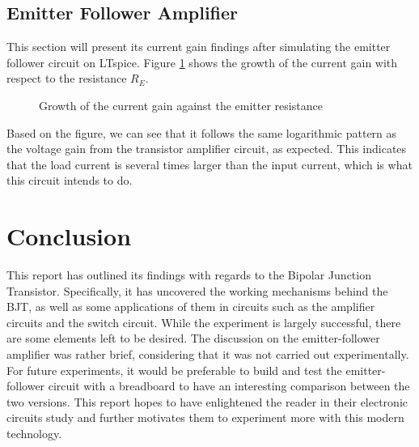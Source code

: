 \documentclass[11pt]{report}
\begin{document}
\subsection{Emitter Follower Amplifier}
This section will present its current gain findings after simulating the emitter follower circuit on LTspice. Figure \ref{sect4} shows the growth of the current gain with respect to the resistance $R_E$.
\begin{figure}[h]
	\centering
	\caption{Growth of the current gain against the emitter resistance}
	\label{sect4}
\end{figure}
Based on the figure, we can see that it follows the same logarithmic pattern as the voltage gain from the transistor amplifier circuit, as expected. This indicates that the load current is several times larger than the input current, which is what this circuit intends to do.

\section{Conclusion}
This report has outlined its findings with regards to the Bipolar Junction Transistor. Specifically, it has uncovered the working mechanisms behind the BJT, as well as some applications of them in circuits such as the amplifier circuits and the switch circuit. While the experiment is largely successful, there are some elements left to be desired. The discussion on the emitter-follower amplifier was rather brief, considering that it was not carried out experimentally. For future experiments, it would be preferable to build and test the emitter-follower circuit with a breadboard to have an interesting comparison between the two versions. This report hopes to have enlightened the reader in their electronic circuits study and further motivates them to experiment more with this modern technology.

\printbibliography
\end{document}
